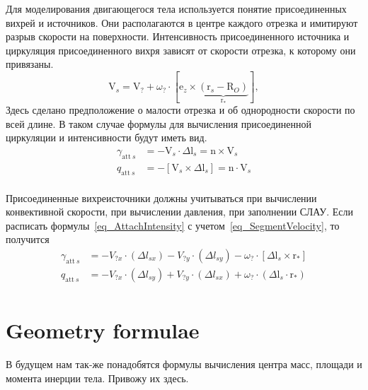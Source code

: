 \documentclass[a4paper,14pt]{extreport}
\newcommand{\br}[1]{\boldsymbol{\mathrm{#1}}}
\renewcommand{\vec}[1]{\br{#1}}
\newcommand{\att}{\text{att}}
\begin{document}
Для моделирования двигающегося тела используется понятие присоединенных вихрей и источников. Они располагаются в центре каждого отрезка и имитируют разрыв скорости на поверхности. %
Интенсивность присоединенного источника и циркуляция присоединенного вихря зависят от скорости отрезка, к которому они привязаны.
\begin{equation}
\label{eq_SegmentVelocity}
\vec V_s = \vec V_? + \omega_? \cdot [\vec e_z \times \underbrace{(\vec r_s - \vec R_O)}_{\vec r_*}],
\end{equation}
Здесь сделано предположение о малости отрезка и об однородности скорости по всей длине. В таком случае формулы для вычисления присоединенной циркуляции и интенсивности будут иметь вид.
\begin{equation}
\label{eq_AttachIntensity}
\begin{split}
\gamma_{\att~s} &= -\vec V_s \cdot \Delta \vec l_s  = \vec n \times \vec V_s\\
q_{\att~s} &= -[\vec V_s \times \Delta \vec l_s] = \vec n \cdot \vec V_s\\
\end{split}
\end{equation}

Присоединенные вихреисточники должны учитываться при вычислении конвективной скорости, при вычислении давления, при заполнении СЛАУ.
Если расписать формулы~\ref{eq_AttachIntensity} с учетом~\ref{eq_SegmentVelocity}, то получится
\begin{equation}
\label{eq_AttachIntensityLong}
\begin{split}
\gamma_{\att~s} &=
-V_{?x} \cdot (\Delta l_{sx}) - V_{?y} \cdot (\Delta l_{sy}) - \omega_? \cdot [\Delta \vec l_s \times \vec r_*]\\
q_{\att~s} &=
-V_{?x} \cdot (\Delta l_{sy}) + V_{?y} \cdot (\Delta l_{sx}) + \omega_? \cdot (\Delta \vec l_s \cdot \vec r_*)\\
\end{split}
\end{equation}

\section{Geometry formulae}
В будущем нам так-же понадобятся формулы вычисления центра масс, площади и момента инерции тела. Привожу их здесь.
\end{document}

